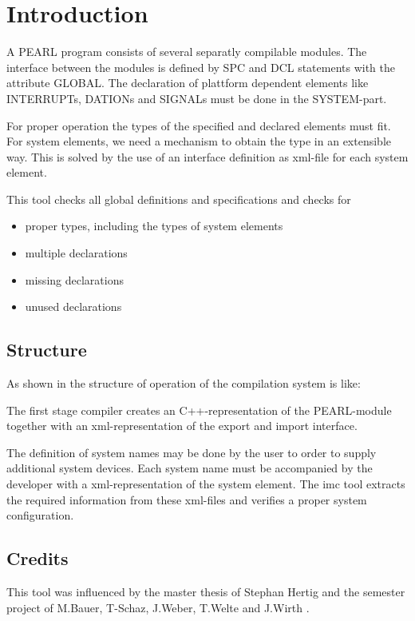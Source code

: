 \chapter{Introduction}
A PEARL program consists of several separatly compilable modules.
The interface between the modules is defined by SPC and DCL statements with the
attribute GLOBAL.
The declaration of plattform dependent elements like INTERRUPTs, 
DATIONs and SIGNALs must be done in the SYSTEM-part.

For proper operation the types of the specified and declared elements must
fit. 
For system elements, we need a mechanism to obtain the type in an
extensible way. This is solved by the use of an interface definition as 
xml-file for each system element.

This tool checks all global definitions and specifications and checks for
\begin{itemize}
\item proper types, including the types of system elements
\item multiple declarations
\item missing declarations
\item unused declarations
\end{itemize}

\section{Structure}
As shown in \cite{mueller2016} the structure of operation of the \OpenPEARL{}
compilation system is like:


The first stage compiler creates an C++-representation of the PEARL-module
together with an xml-representation of the export and import interface.

The definition of system names may be done by the user to order to supply 
additional system devices.
Each system name must be accompanied by the developer with a xml-representation
of the system element. The imc tool extracts the required information
from these xml-files and verifies a proper system configuration.

\section{Credits}
This tool  was influenced by the master thesis of 
Stephan Hertig \cite{msc_hertwig} and the semester project of
M.Bauer, T-Schaz, J.Weber, T.Welte and J.Wirth \cite{openpearlss16}.


